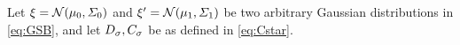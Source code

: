 Let $\xi= \mathcal{N}(\mu_0,\Sigma_0)$ and $\xi' = \mathcal{N}(\mu_1,\Sigma_1)$ be two arbitrary Gaussian distributions in \eqref{eq:GSB}, and let $D_{\sigma}, C_{\sigma_{}}$ be as defined in \eqref{eq:Cstar}.
